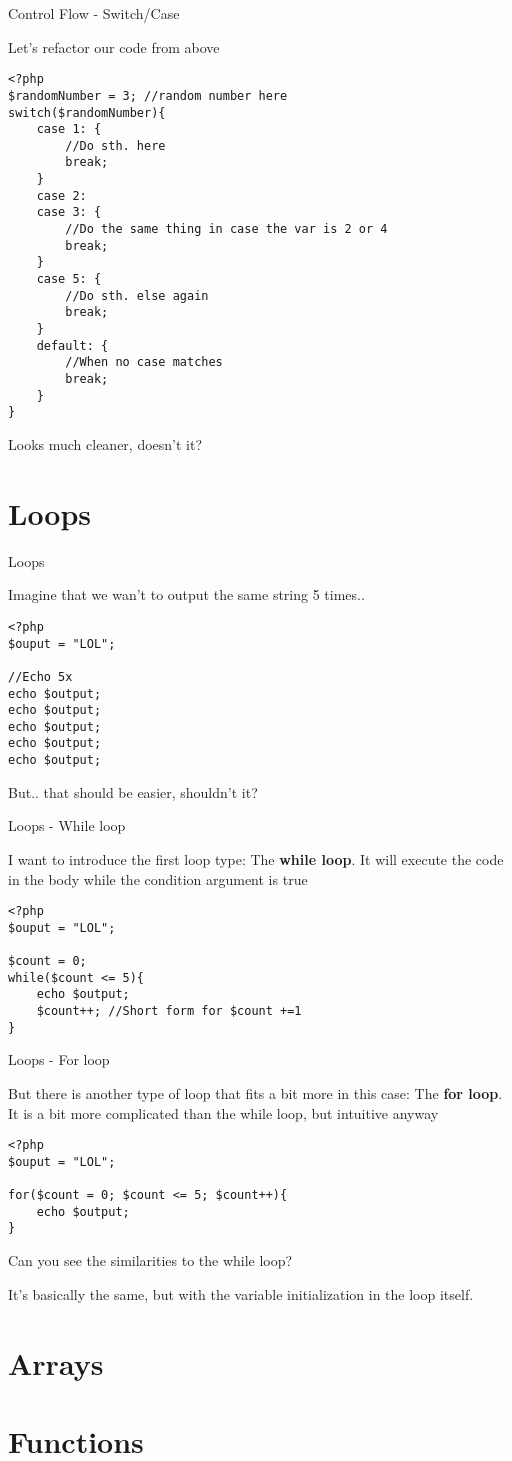 \begin{frame}[fragile]{Control Flow - Switch/Case}

Let's refactor our code from above
\begin{lstlisting}
<?php
$randomNumber = 3; //random number here
switch($randomNumber){
	case 1: {
		//Do sth. here
		break;
	}
	case 2:
	case 3: {
		//Do the same thing in case the var is 2 or 4
		break;
	}
	case 5: {
		//Do sth. else again
		break;
	}
	default: {
		//When no case matches
		break;
	}
}
\end{lstlisting} 
\pause

Looks much cleaner, doesn't it?

\end{frame}

\section{Loops}

\begin{frame}[fragile]{Loops}

Imagine that we wan't to output the same string 5 times.. \pause

\begin{lstlisting}
<?php
$ouput = "LOL";

//Echo 5x
echo $output;
echo $output;
echo $output;
echo $output;
echo $output;
\end{lstlisting} 
\pause

But.. that should be easier, shouldn't it?

\end{frame}


\begin{frame}[fragile]{Loops - While loop}

I want to introduce the first loop type: The \textbf{while loop}.
It will execute the code in the body while the condition argument is true  \pause

\begin{lstlisting}
<?php
$ouput = "LOL";

$count = 0;
while($count <= 5){
	echo $output;
	$count++; //Short form for $count +=1
}
\end{lstlisting} 

\end{frame}

\begin{frame}[fragile]{Loops - For loop}

But there is another type of loop that fits a bit more in this case: The \textbf{for loop}.
It is a bit more complicated than the while loop, but intuitive anyway\pause

\begin{lstlisting}
<?php
$ouput = "LOL";

for($count = 0; $count <= 5; $count++){
	echo $output;
}
\end{lstlisting} \pause

Can you see the similarities to the while loop?

It's basically the same, but with the variable initialization in the loop itself.
\end{frame}

\section{Arrays}
\section{Functions}


